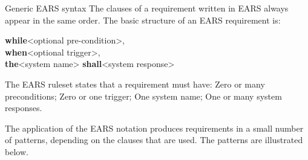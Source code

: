\documentclass[aspectratio=169]{beamer}
\begin{document}




\newcommand{\mkw}[2]{\textcolor{#2}{\textbf{#1}}\xspace}
\newcommand{\ewhile}{\mkw{while}{pink!75!black}}
\newcommand{\ewhere}{\mkw{where}{pink!75!black}}
\newcommand{\eif}{\mkw{if}{pink!75!black}}
\newcommand{\ethen}{\mkw{then}{pink!75!black}}
\newcommand{\ewhen}{\mkw{when}{blue!75!black}}
\newcommand{\ethe}{\mkw{the}{purple!75!black}}
\newcommand{\eshall}{\mkw{shall}{red!75!black}}

\begin{slide}{Generic EARS syntax}
    The clauses of a requirement written in EARS always appear in the same order. The basic structure of an EARS requirement is:

    \begin{block}{}\ttfamily
    \ewhile <optional pre-condition>, \\
     \ewhen <optional trigger>, \\
      \ethe <system name> \eshall <system response> 
    \end{block}

  The EARS ruleset states that a requirement must have: Zero or many preconditions; Zero or one trigger; One system name; One or many system responses.

The application of the EARS notation produces requirements in a small number of patterns, depending on the clauses that are used. The patterns are illustrated below.
\end{slide}
\end{document}
